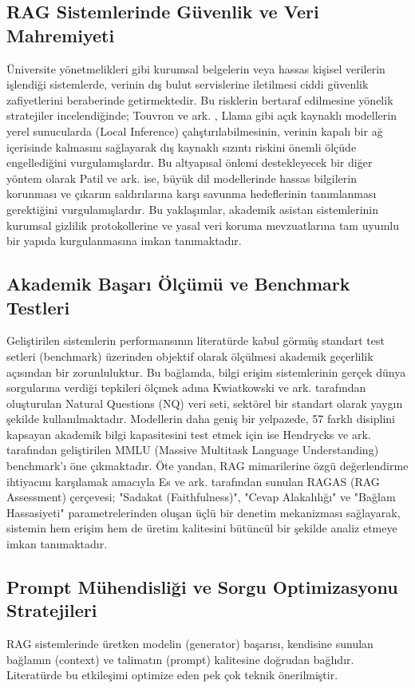 \documentclass[12pt,a4paper]{report}
\begin{document}
\subsection{RAG Sistemlerinde Güvenlik ve Veri Mahremiyeti}
Üniversite yönetmelikleri gibi kurumsal belgelerin veya hassas kişisel verilerin işlendiği sistemlerde, verinin dış bulut servislerine iletilmesi ciddi güvenlik zafiyetlerini beraberinde getirmektedir. Bu risklerin bertaraf edilmesine yönelik stratejiler incelendiğinde; Touvron ve ark. \cite{touvron2023llama}, Llama gibi açık kaynaklı modellerin yerel sunucularda (Local Inference) çalıştırılabilmesinin, verinin kapalı bir ağ içerisinde kalmasını sağlayarak dış kaynaklı sızıntı riskini önemli ölçüde engellediğini vurgulamışlardır. Bu altyapısal önlemi destekleyecek bir diğer yöntem olarak Patil ve ark. \cite{patil2023pii} ise, büyük dil modellerinde hassas bilgilerin korunması ve çıkarım saldırılarına karşı savunma hedeflerinin tanımlanması gerektiğini vurgulamışlardır. Bu yaklaşımlar, akademik asistan sistemlerinin kurumsal gizlilik protokollerine ve yasal veri koruma mevzuatlarına tam uyumlu bir yapıda kurgulanmasına imkan tanımaktadır.

\subsection{Akademik Başarı Ölçümü ve Benchmark Testleri}
Geliştirilen sistemlerin performansının literatürde kabul görmüş standart test setleri (benchmark) üzerinden objektif olarak ölçülmesi akademik geçerlilik açısından bir zorunluluktur. Bu bağlamda, bilgi erişim sistemlerinin gerçek dünya sorgularına verdiği tepkileri ölçmek adına Kwiatkowski ve ark. \cite{kwiatkowski2019natural} tarafından oluşturulan Natural Questions (NQ) veri seti, sektörel bir standart olarak yaygın şekilde kullanılmaktadır. Modellerin daha geniş bir yelpazede, 57 farklı disiplini kapsayan akademik bilgi kapasitesini test etmek için ise Hendrycks ve ark. \cite{hendrycks2021measuring} tarafından geliştirilen MMLU (Massive Multitask Language Understanding) benchmark'ı öne çıkmaktadır. Öte yandan, RAG mimarilerine özgü değerlendirme ihtiyacını karşılamak amacıyla Es ve ark. \cite{es2023ragas} tarafından sunulan RAGAS (RAG Assessment) çerçevesi; "Sadakat (Faithfulness)", "Cevap Alakalılığı" ve "Bağlam Hassasiyeti" parametrelerinden oluşan üçlü bir denetim mekanizması sağlayarak, sistemin hem erişim hem de üretim kalitesini bütüncül bir şekilde analiz etmeye imkan tanımaktadır.


\subsection{Prompt Mühendisliği ve Sorgu Optimizasyonu Stratejileri}
RAG sistemlerinde üretken modelin (generator) başarısı, kendisine sunulan bağlamın (context) ve talimatın (prompt) kalitesine doğrudan bağlıdır. Literatürde bu etkileşimi optimize eden pek çok teknik önerilmiştir.
\end{document}
